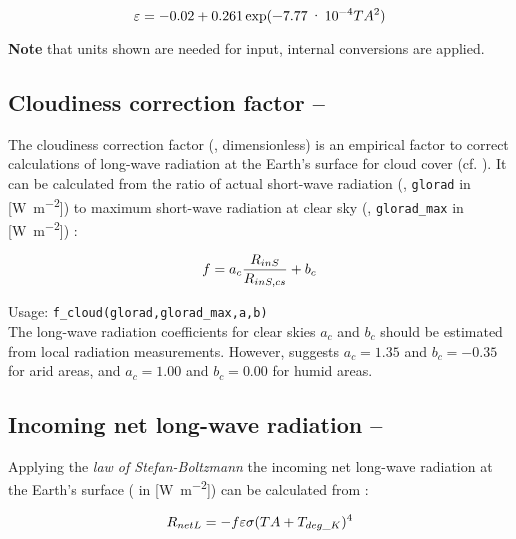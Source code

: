 \begin{equation}\label{eqn:meteo:emis_2}
\varepsilon{} = -0.02 + 0.261 \exp(\num{-7.77e-4} TA{}^2)
\end{equation}

\textbf{Note} that units shown are needed for input, internal conversions are applied.


\subsection{Cloudiness correction factor -- \cloudCorrFac} \label{sec:meteo:cloudcorr}
The cloudiness correction factor (\cloudCorrFac{}, dimensionless) is an empirical factor to correct calculations of long-wave radiation at the Earth's surface for cloud cover (cf. ). It can be calculated from the ratio of actual short-wave radiation (\radShortwaveIn{}, \verb!glorad! in [\si{\watt\per\metre\squared}]) to maximum short-wave radiation at clear sky (\radShortwaveInClearsky{}, \verb!glorad_max! in [\si{\watt\per\metre\squared}]) \citep{Maidment1993}:

\begin{equation}\label{eqn:meteo:cloudcorr}
f{} = a_c \frac{R_{inS}{}}{R_{inS,cs}{}} + b_c
\end{equation}

\noindent
Usage:
\verb!f_cloud(glorad,glorad_max,a,b)!\\

The long-wave radiation coefficients for clear skies $a_c$ and $b_c$ should be estimated from local radiation measurements. However, \citet{Maidment1993} suggests $a_c = \num{1.35}$ and $b_c = \num{-0.35}$ for arid areas, and $a_c = \num{1.00}$ and $b_c = \num{0.00}$ for humid areas.


\subsection{Incoming net long-wave radiation -- \netRadiationLong} \label{sec:meteo:radnetlong}
Applying the \emph{law of Stefan-Boltzmann} the incoming net long-wave radiation at the Earth's surface (\netRadiationLong{} in [\si{\watt\per\metre\squared}]) can be calculated from \citep{Maidment1993}:

\begin{equation}\label{eqn:meteo:radnetlong}
R_{netL}{} = - f{} \varepsilon{} \sigma{} (TA{} + T_{deg\_K})^4
\end{equation}

